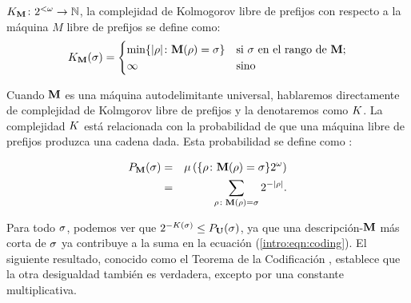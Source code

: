 \begin{definicion}\label{seleccion:def:prefixK}
\glossary{$\KM$}$K_{{\bf M}}\colon2^{<\omega} \to \mathbb{N}$, la complejidad de Kolmogorov libre de prefijos con respecto a la máquina $M$ libre de prefijos se define como:
$$
K_{{\bf M}}(\sigma)=
    \begin{cases}
    \min \{| \rho |\colon {\bf M}(\rho)=\sigma \} & \textrm{si $\sigma$ en el rango de ${\bf M}$};\\
    \infty & \textrm{sino}
    \end{cases}
$$
\end{definicion}



\bigskip




Cuando ${\bf M}$ es una máquina autodelimitante universal, hablaremos directamente de complejidad de Kolmgorov libre de prefijos y la denotaremos como $K$. La complejidad $K$ está relacionada con la probabilidad de que una máquina libre de prefijos produzca una cadena dada. Esta probabilidad se define como :

\begin{eqnarray}
P_{{\bf M}}(\sigma)&=&\mu\left(\{\rho\colon{\bf M}(\rho)=\sigma\}2^{\omega}\right)\nonumber\\
&=&\sum_{\rho\colon{\bf M}(\rho)=\sigma}2^{-| \rho |}.\label{intro:eqn:coding}
\end{eqnarray}

Para todo $\sigma$, podemos ver que $2^{-K(\sigma)}\leq P_{{\bf U}}(\sigma)$, ya que una descripción-${\bf M}$ más corta de $\sigma$ ya contribuye a la suma en la ecuación (\ref{intro:eqn:coding}). El siguiente resultado, conocido como el Teorema de la Codificación \cite{levin1974laws,G74,chaitin1975theory}, establece que la otra desigualdad también es verdadera, excepto por una constante multiplicativa.

